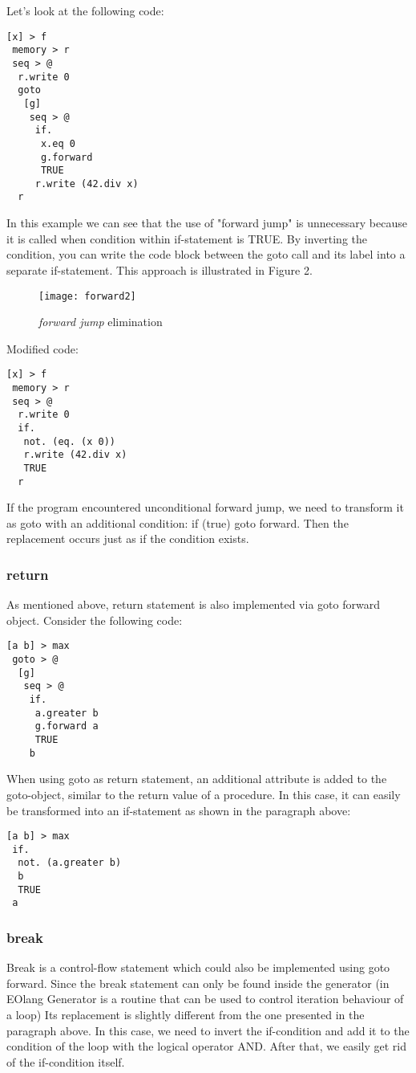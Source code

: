 \documentclass[two column]{article}
\begin{document}
Let's look at the following code:
\begin{lstlisting}
[x] > f
 memory > r
 seq > @
  r.write 0
  goto
   [g]
    seq > @
     if.
      x.eq 0
      g.forward
      TRUE
     r.write (42.div x)
  r
\end{lstlisting}

In this example we can see that the use of "forward jump" is unnecessary because it is called when condition within if-statement is TRUE. By inverting the condition, you can write the code block between the goto call and its label into a separate if-statement. This approach is illustrated in Figure 2.

\begin{figure}
    \centering
    \texttt{[image: forward2]}
    \caption{\textit{forward jump} elimination}
    \label{fig:my_label}
\end{figure}

Modified code:
\begin{lstlisting}
[x] > f
 memory > r
 seq > @
  r.write 0
  if.
   not. (eq. (x 0))
   r.write (42.div x)
   TRUE
  r
\end{lstlisting}

If the program encountered unconditional forward jump, we need to transform it as goto with an additional condition: if (true) goto forward. Then the replacement occurs just as if the condition exists.

\subsubsection{return}
As mentioned above, return statement is also implemented via goto forward object. Consider the following code:
\begin{lstlisting}
[a b] > max
 goto > @
  [g]
   seq > @
    if.
     a.greater b
     g.forward a
     TRUE
    b
\end{lstlisting}
When using goto as return statement, an additional attribute is added to the goto-object, similar to the return value of a procedure.
In this case, it can easily be transformed into an if-statement as shown in the paragraph above:
\begin{lstlisting}
[a b] > max
 if.
  not. (a.greater b)
  b
  TRUE
 a
\end{lstlisting}

\subsubsection{break}
Break is a control-flow statement which could also be implemented using goto forward. Since the break statement can only be found inside the generator (in EOlang Generator is a routine that can be used to control iteration behaviour of a loop) Its replacement is slightly different from the one presented in the paragraph above.
In this case, we need to invert the if-condition and add it to the condition of the loop with the logical operator AND.
After that, we easily get rid of the if-condition itself.
\end{document}
